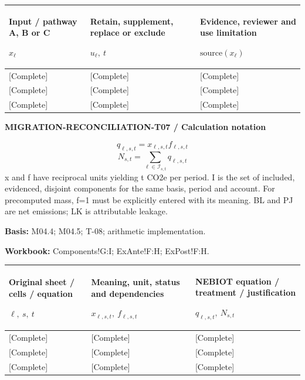 {\sffamily\fontsize{8.3}{10.3}\selectfont\begin{longtable}{@{}P{54.83mm} P{54.83mm} P{54.83mm}@{}}
\toprule
\textbf{Input / pathway A, B or C}\par {\normalfont\fontsize{8.2}{10}\selectfont $x_{\ell}$} & \textbf{Retain, supplement, replace or exclude}\par {\normalfont\fontsize{8.2}{10}\selectfont $u_{\ell},\ t$} & \textbf{Evidence, reviewer and use limitation}\par {\normalfont\fontsize{8.2}{10}\selectfont $\text{source}(x_{\ell})$}\\\midrule\endhead
\rule{0pt}{8mm}[Complete] & [Complete] & [Complete]\\\hline
\rule{0pt}{8mm}[Complete] & [Complete] & [Complete]\\\hline
\rule{0pt}{8mm}[Complete] & [Complete] & [Complete]\\\hline
\end{longtable}}
\par\begingroup\sffamily\fontsize{8}{10}\selectfont\color{NEBGreen}\setlength{\parskip}{2pt}\setlength{\abovedisplayskip}{4pt}\setlength{\belowdisplayskip}{4pt}\setlength{\abovedisplayshortskip}{2pt}\setlength{\belowdisplayshortskip}{3pt}
\textbf{MIGRATION-RECONCILIATION-T07 / Calculation notation}\par
{\fontsize{9}{11}\selectfont\[ q_{\ell,s,t}=x_{\ell,s,t}f_{\ell,s,t} \]}
{\fontsize{9}{11}\selectfont\[ N_{s,t}=\sum_{\ell\in\mathcal I_{s,t}}q_{\ell,s,t} \]}
x and f have reciprocal units yielding t CO2e per period. I is the set of included, evidenced, disjoint components for the same basis, period and account. For precomputed mass, f=1 must be explicitly entered with its meaning. BL and PJ are net emissions; LK is attributable leakage.\par
\textbf{Basis:} M04.4; M04.5; T-08; arithmetic implementation.\par
\textbf{Workbook:} Components!G:I; ExAnte!F:H; ExPost!F:H.\par\endgroup
{\sffamily\fontsize{8.3}{10.3}\selectfont\begin{longtable}{@{}P{54.83mm} P{54.83mm} P{54.83mm}@{}}
\toprule
\textbf{Original sheet / cells / equation}\par {\normalfont\fontsize{8.2}{10}\selectfont $\ell,\ s,\ t$} & \textbf{Meaning, unit, status and dependencies}\par {\normalfont\fontsize{8.2}{10}\selectfont $x_{\ell,s,t},\ f_{\ell,s,t}$} & \textbf{NEBIOT equation / treatment / justification}\par {\normalfont\fontsize{8.2}{10}\selectfont $q_{\ell,s,t},\ N_{s,t}$}\\\midrule\endhead
\rule{0pt}{8mm}[Complete] & [Complete] & [Complete]\\\hline
\rule{0pt}{8mm}[Complete] & [Complete] & [Complete]\\\hline
\rule{0pt}{8mm}[Complete] & [Complete] & [Complete]\\\hline
\end{longtable}}
